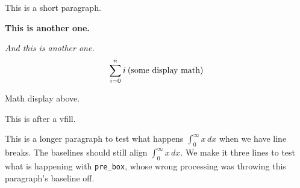 
\nopagenumbers
This is a short paragraph.
\par\bf This is another one.\rm
\par\it And this is another one.\rm
$$\sum_{i=0}^n i\> \hbox{\rm (some display math)}$$
\par Math display above.
\vfill
\par This is after a vfill.
\par This is a longer paragraph to test what happens $\int_0^\infty x\,dx$ when we have line breaks. The baselines should still align
$\int_0^\infty x\,dx$. We make it three lines to test what is happening with {\tt pre\_box}, whose wrong processing was throwing this
paragraph's baseline off.
\bye
